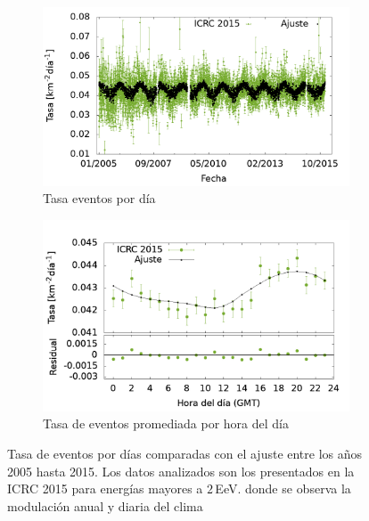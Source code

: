 			\begin{figure}[H]
				\begin{subfigure}[b]{0.5\textwidth}
				\includegraphics[width=\textwidth]{../clima/Graphs/rate_dayly/2EeV_ICRC_2015.png}
				\caption{Tasa eventos por día}\label{fig:rate_dayly_ICRC_2015_2EeV}
    			\end{subfigure}%
    			\hspace{\fill}
    			\begin{subfigure}[b]{0.5\textwidth}
				\includegraphics[width=\textwidth]{../clima/Graphs/rate_hour_of_the_day/2EeV_ICRC_2015_old_herald.png}
				\caption{Tasa de eventos promediada por hora del día }\label{fig:rate_hod_ICRC_2015_2EeV}
    			\end{subfigure}%
				\caption{Tasa de eventos por días comparadas con el ajuste entre los años 2005 hasta 2015. Los datos analizados son los presentados en la ICRC 2015 para energías mayores a $2\,$EeV. donde se observa la modulación anual y diaria del clima }\label{fig:rate_2015_05-15_2EeV}
			\end{figure}

